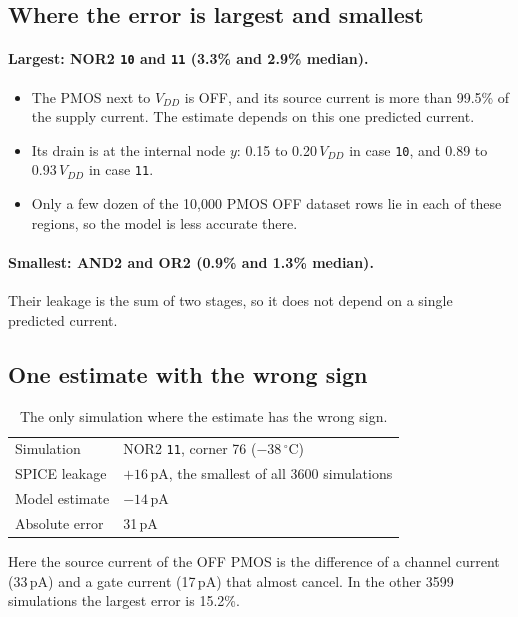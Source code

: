 \documentclass[11pt]{article}
\begin{document}
\subsection{Where the error is largest and smallest}

\paragraph{Largest: NOR2 \texttt{10} and \texttt{11} (3.3\% and 2.9\% median).}
\begin{itemize}
    \item The PMOS next to $V_{DD}$ is OFF, and its source current is more
          than 99.5\% of the supply current. The estimate depends on this
          one predicted current.
    \item Its drain is at the internal node $y$: 0.15 to 0.20\,$V_{DD}$ in
          case \texttt{10}, and 0.89 to 0.93\,$V_{DD}$ in case \texttt{11}.
    \item Only a few dozen of the 10{,}000 PMOS OFF dataset rows lie in each
          of these regions, so the model is less accurate there.
\end{itemize}

\paragraph{Smallest: AND2 and OR2 (0.9\% and 1.3\% median).}
Their leakage is the sum of two stages, so it does not depend on a single
predicted current.

\subsection{One estimate with the wrong sign}

\begin{table}[H]
\centering
\begin{tabular}{ll}
\toprule
Simulation & NOR2 \texttt{11}, corner 76 ($-38\,^\circ$C) \\
SPICE leakage & $+16$\,pA, the smallest of all 3600 simulations \\
Model estimate & $-14$\,pA \\
Absolute error & 31\,pA \\
\bottomrule
\end{tabular}
\caption{The only simulation where the estimate has the wrong sign.}
\label{tab:sign}
\end{table}

Here the source current of the OFF PMOS is the difference of a channel
current (33\,pA) and a gate current (17\,pA) that almost cancel. In the
other 3599 simulations the largest error is 15.2\%.
\end{document}
